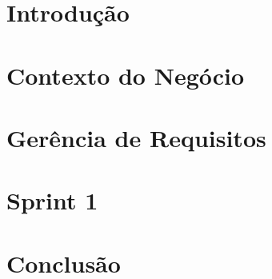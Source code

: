 \chapter{Introdução}


\chapter{Contexto do Negócio}


\chapter{Gerência de Requisitos}


\chapter{Sprint 1}


\chapter{Conclusão}

